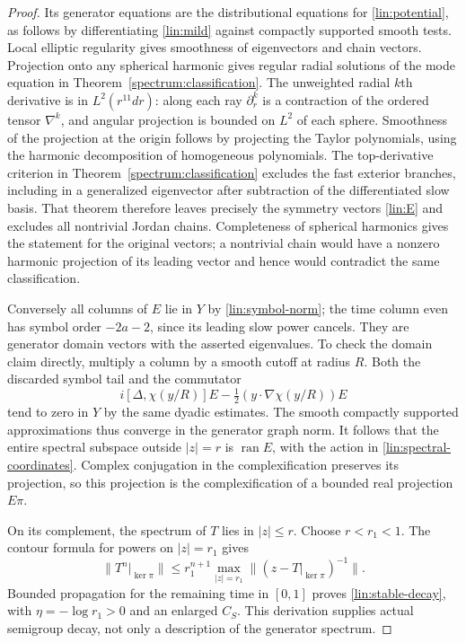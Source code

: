\documentclass[11pt]{article}
\numberwithin{equation}{section}
\theoremstyle{definition}
\theoremstyle{remark}
\begin{document}
\begin{proof}
Its generator equations are the distributional equations for
\eqref{lin:potential}, as follows by differentiating
\eqref{lin:mild} against compactly supported smooth tests.  Local
elliptic regularity gives smoothness of eigenvectors and chain
vectors.  Projection onto any spherical harmonic gives regular
radial solutions of the mode equation in
Theorem~\ref{spectrum:classification}.  The unweighted radial $k$th
derivative is in $L^2(r^{11}dr)$: along each ray $\partial_r^k$ is a
contraction of the ordered tensor $\nabla^k$, and angular projection
is bounded on $L^2$ of each sphere.  Smoothness of the projection at
the origin follows by projecting the Taylor polynomials, using the
harmonic decomposition of homogeneous polynomials.  The
top-derivative criterion in Theorem~\ref{spectrum:classification}
excludes the fast exterior branches, including in a generalized
eigenvector after subtraction of the differentiated slow basis.
That theorem therefore leaves precisely the symmetry vectors
\eqref{lin:E} and excludes all nontrivial Jordan chains.  Completeness
of spherical harmonics gives the statement for the original vectors;
a nontrivial chain would have a nonzero harmonic projection of its
leading vector and hence would contradict the same classification.

Conversely all columns of $E$ lie in $Y$ by
\eqref{lin:symbol-norm}; the time column even has symbol order
$-2a-2$, since its leading slow power cancels.  They are generator
domain vectors with the asserted eigenvalues.  To check the domain
claim directly, multiply a column by a smooth cutoff at radius $R$.
Both the discarded symbol tail and the commutator
\[
 i[\Delta,\chi(y/R)]E-\tfrac12(y\cdot\nabla\chi(y/R))E
\]
tend to zero in $Y$ by the same dyadic estimates.  The smooth compactly
supported approximations thus converge in the generator graph norm.
It follows that the entire spectral subspace outside $|z|=r$ is
$\operatorname{ran}E$, with the action in
\eqref{lin:spectral-coordinates}.  Complex conjugation in the
complexification preserves its projection, so this projection is the
complexification of a bounded real projection $E\pi$.

On its complement, the spectrum of $T$ lies in $|z|\le r$.  Choose
$r<r_1<1$.  The contour formula for powers on $|z|=r_1$ gives
\[
 \|T^n|_{\ker\pi}\|
 \le r_1^{n+1}\max_{|z|=r_1}
                  \|(z-T|_{\ker\pi})^{-1}\|.
\]
Bounded propagation for the remaining time in $[0,1]$ proves
\eqref{lin:stable-decay}, with $\eta=-\log r_1>0$ and an enlarged
$C_S$.  This derivation supplies actual semigroup decay, not only a
description of the generator spectrum.
\end{proof}
\end{document}

